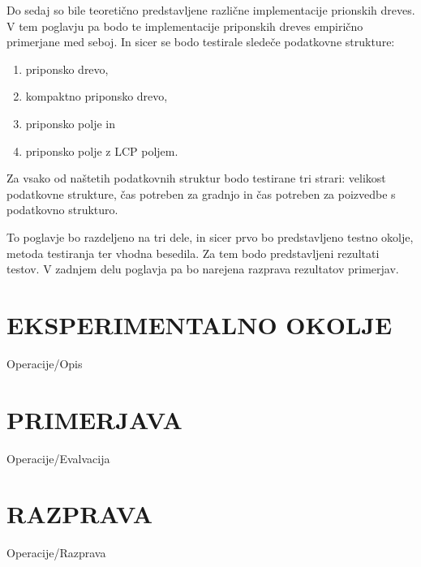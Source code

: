 Do sedaj so bile teoretično predstavljene različne implementacije prionskih dreves. V tem poglavju pa bodo te implementacije priponskih dreves empirično primerjane med seboj. In sicer se bodo testirale sledeče podatkovne strukture:
\begin{enumerate}
        \item priponsko drevo, %
        \item kompaktno priponsko drevo, 
        \item priponsko polje in 
        \item priponsko polje z LCP poljem.
\end{enumerate}
Za vsako od naštetih podatkovnih struktur bodo testirane tri strari: velikost podatkovne strukture, čas potreben za gradnjo in čas potreben za poizvedbe s podatkovno strukturo.

To poglavje bo razdeljeno na tri dele, in sicer prvo bo predstavljeno testno okolje, metoda testiranja ter vhodna besedila. Za tem bodo predstavljeni rezultati testov. V zadnjem delu poglavja pa bo narejena razprava rezultatov primerjav.

\section{EKSPERIMENTALNO OKOLJE}\label{sec:opis}
{Operacije/Opis}


\section{PRIMERJAVA}\label{sec:primerjava}
{Operacije/Evalvacija}

\section{RAZPRAVA}\label{sec:razprava}
{Operacije/Razprava}